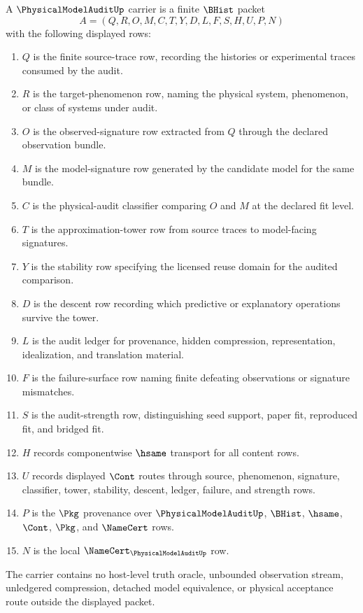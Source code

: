 \begin{definition}
\label{def:physical-model-audit-bhist-carrier}
A $\PhysicalModelAuditUp$ carrier is a finite $\BHist$ packet
$$
A=(Q,R,O,M,C,T,Y,D,L,F,S,H,U,P,N)
$$
with the following displayed rows:
\begin{enumerate}
\item $Q$ is the finite source-trace row, recording the histories or experimental traces consumed by the audit.
\item $R$ is the target-phenomenon row, naming the physical system, phenomenon, or class of systems under audit.
\item $O$ is the observed-signature row extracted from $Q$ through the declared observation bundle.
\item $M$ is the model-signature row generated by the candidate model for the same bundle.
\item $C$ is the physical-audit classifier comparing $O$ and $M$ at the declared fit level.
\item $T$ is the approximation-tower row from source traces to model-facing signatures.
\item $Y$ is the stability row specifying the licensed reuse domain for the audited comparison.
\item $D$ is the descent row recording which predictive or explanatory operations survive the tower.
\item $L$ is the audit ledger for provenance, hidden compression, representation, idealization, and translation material.
\item $F$ is the failure-surface row naming finite defeating observations or signature mismatches.
\item $S$ is the audit-strength row, distinguishing seed support, paper fit, reproduced fit, and bridged fit.
\item $H$ records componentwise $\hsame$ transport for all content rows.
\item $U$ records displayed $\Cont$ routes through source, phenomenon, signature, classifier, tower, stability, descent, ledger, failure, and strength rows.
\item $P$ is the $\Pkg$ provenance over $\PhysicalModelAuditUp$, $\BHist$, $\hsame$, $\Cont$, $\Pkg$, and $\NameCert$ rows.
\item $N$ is the local $\NameCert_{\PhysicalModelAuditUp}$ row.
\end{enumerate}
The carrier contains no host-level truth oracle, unbounded observation stream, unledgered compression, detached model equivalence, or physical acceptance route outside the displayed packet.
\end{definition}

